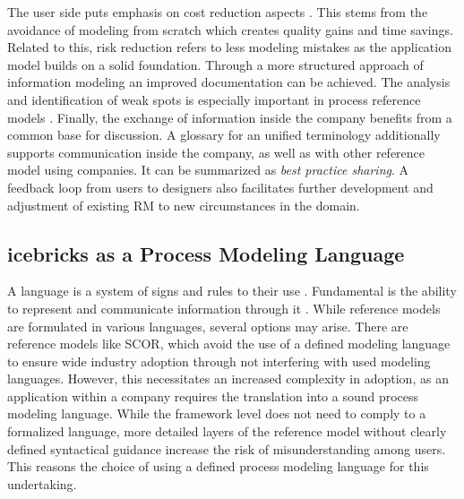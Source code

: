 		The user side puts emphasis on cost reduction aspects . This stems from the avoidance of modeling from scratch which creates quality gains and time savings. Related to this, risk reduction refers to less modeling mistakes as the application model builds on a solid foundation. Through a more structured approach of information modeling an improved documentation can be achieved. The analysis and identification of weak spots is especially important in process reference models \citep[]{becker2004handelsinformationssysteme}. Finally, the exchange of information inside the company benefits from a common base for discussion. \cite{glossar nicht wirklich zwingend drin...}A glossary for an unified terminology additionally supports communication inside the company, as well as with other reference model using companies. It can be summarized as \textit{best practice sharing}. A feedback loop from users to designers also facilitates further development and adjustment of existing \acrshort{RM} to new circumstances in the domain. 
		
		\subsection{icebricks as a Process Modeling Language}
		
	 A language is a system of signs and rules to their use \citep[]{holten1999}. Fundamental is the ability to represent and communicate information through it \citep[]{brocke2003referenzmodellierung}. While reference models are formulated in various languages, several options may arise. There are reference models like \acrshort{SCOR}, which avoid the use of a defined modeling language to ensure wide industry adoption through not interfering with used modeling languages. However, this necessitates an increased complexity in adoption, as an application within a company requires the translation into a sound process modeling language. While the framework level does not need to comply to a formalized language, more detailed layers of the reference model without clearly defined syntactical guidance increase the risk of misunderstanding among users.
	 This reasons the choice of using a defined process modeling language for this undertaking.
	 
